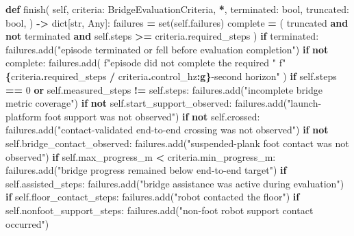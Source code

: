 \documentclass[
  chinese,
  11pt,
  letterpaper,
]{article}
\newenvironment{Shaded}{\begin{snugshade}}{\end{snugshade}}
\newcommand{\BuiltInTok}[1]{#1}
\newcommand{\ControlFlowTok}[1]{\textcolor[rgb]{0.13,0.29,0.53}{\textbf{#1}}}
\newcommand{\DecValTok}[1]{\textcolor[rgb]{0.00,0.00,0.81}{#1}}
\newcommand{\KeywordTok}[1]{\textcolor[rgb]{0.13,0.29,0.53}{\textbf{#1}}}
\newcommand{\NormalTok}[1]{#1}
\newcommand{\OperatorTok}[1]{\textcolor[rgb]{0.81,0.36,0.00}{\textbf{#1}}}
\newcommand{\SpecialCharTok}[1]{\textcolor[rgb]{0.81,0.36,0.00}{\textbf{#1}}}
\newcommand{\SpecialStringTok}[1]{\textcolor[rgb]{0.31,0.60,0.02}{#1}}
\newcommand{\StringTok}[1]{\textcolor[rgb]{0.31,0.60,0.02}{#1}}
\newcommand{\VariableTok}[1]{\textcolor[rgb]{0.00,0.00,0.00}{#1}}
\renewenvironment{Shaded}{\par\smallskip}{\par\smallskip}
\begin{document}
\begin{Shaded}
\begin{Highlighting}[]
    \KeywordTok{def}\NormalTok{ finish(}
        \VariableTok{self}\NormalTok{,}
\NormalTok{        criteria: BridgeEvaluationCriteria,}
        \OperatorTok{*}\NormalTok{,}
\NormalTok{        terminated: }\BuiltInTok{bool}\NormalTok{,}
\NormalTok{        truncated: }\BuiltInTok{bool}\NormalTok{,}
\NormalTok{    ) }\OperatorTok{{-}\textgreater{}} \BuiltInTok{dict}\NormalTok{[}\BuiltInTok{str}\NormalTok{, Any]:}
\NormalTok{        failures }\OperatorTok{=} \BuiltInTok{set}\NormalTok{(}\VariableTok{self}\NormalTok{.failures)}
\NormalTok{        complete }\OperatorTok{=}\NormalTok{ (}
\NormalTok{            truncated}
            \KeywordTok{and} \KeywordTok{not}\NormalTok{ terminated}
            \KeywordTok{and} \VariableTok{self}\NormalTok{.steps }\OperatorTok{\textgreater{}=}\NormalTok{ criteria.required\_steps}
\NormalTok{        )}
        \ControlFlowTok{if}\NormalTok{ terminated:}
\NormalTok{            failures.add(}\StringTok{"episode terminated or fell before evaluation completion"}\NormalTok{)}
        \ControlFlowTok{if} \KeywordTok{not}\NormalTok{ complete:}
\NormalTok{            failures.add(}
                \SpecialStringTok{f"episode did not complete the required "}
                \SpecialStringTok{f"}\SpecialCharTok{\{}\NormalTok{criteria}\SpecialCharTok{.}\NormalTok{required\_steps }\OperatorTok{/}\NormalTok{ criteria}\SpecialCharTok{.}\NormalTok{control\_hz}\SpecialCharTok{:g\}}\SpecialStringTok{{-}second horizon"}
\NormalTok{            )}
        \ControlFlowTok{if} \VariableTok{self}\NormalTok{.steps }\OperatorTok{==} \DecValTok{0} \KeywordTok{or} \VariableTok{self}\NormalTok{.measured\_steps }\OperatorTok{!=} \VariableTok{self}\NormalTok{.steps:}
\NormalTok{            failures.add(}\StringTok{"incomplete bridge metric coverage"}\NormalTok{)}
        \ControlFlowTok{if} \KeywordTok{not} \VariableTok{self}\NormalTok{.start\_support\_observed:}
\NormalTok{            failures.add(}\StringTok{"launch{-}platform foot support was not observed"}\NormalTok{)}
        \ControlFlowTok{if} \KeywordTok{not} \VariableTok{self}\NormalTok{.crossed:}
\NormalTok{            failures.add(}\StringTok{"contact{-}validated end{-}to{-}end crossing was not observed"}\NormalTok{)}
        \ControlFlowTok{if} \KeywordTok{not} \VariableTok{self}\NormalTok{.bridge\_contact\_observed:}
\NormalTok{            failures.add(}\StringTok{"suspended{-}plank foot contact was not observed"}\NormalTok{)}
        \ControlFlowTok{if} \VariableTok{self}\NormalTok{.max\_progress\_m }\OperatorTok{\textless{}}\NormalTok{ criteria.min\_progress\_m:}
\NormalTok{            failures.add(}\StringTok{"bridge progress remained below end{-}to{-}end target"}\NormalTok{)}
        \ControlFlowTok{if} \VariableTok{self}\NormalTok{.assisted\_steps:}
\NormalTok{            failures.add(}\StringTok{"bridge assistance was active during evaluation"}\NormalTok{)}
        \ControlFlowTok{if} \VariableTok{self}\NormalTok{.floor\_contact\_steps:}
\NormalTok{            failures.add(}\StringTok{"robot contacted the floor"}\NormalTok{)}
        \ControlFlowTok{if} \VariableTok{self}\NormalTok{.nonfoot\_support\_steps:}
\NormalTok{            failures.add(}\StringTok{"non{-}foot robot support contact occurred"}\NormalTok{)}


\end{Highlighting}
\end{Shaded}
\end{document}
